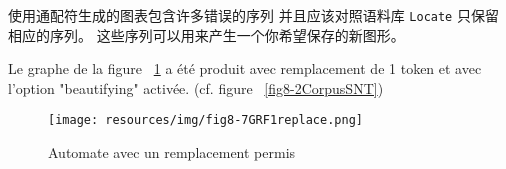 使用通配符生成的图表包含许多错误的序列
并且应该对照语料库 \verb+Locate+ 只保留相应的序列。
这些序列可以用来产生一个你希望保存的新图形。

Le graphe de la figure ~\ref{fig8-7GRF1replace} a été produit avec remplacement de 1 token et avec
l'option "beautifying" activée. (cf. figure ~\ref{fig8-2CorpusSNT})
\begin{figure}[h!]
	\begin{center}
		\texttt{[image: resources/img/fig8-7GRF1replace.png]}
		\caption{Automate avec un remplacement permis\label{fig8-7GRF1replace}}
	\end{center}
\end{figure}



